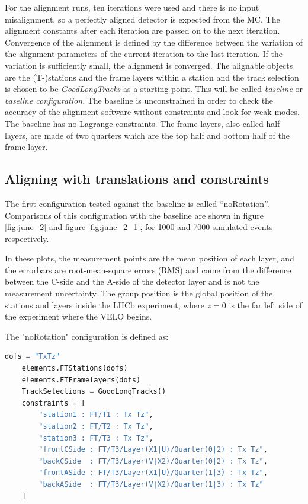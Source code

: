 For the alignment runs, ten iterations were used and there is no input misalignment, so a perfectly aligned detector is expected from the MC.
The alignment constants after each iteration are passed on to the next iteration.
Convergence of the alignment is defined by the difference between the variation of the alignment parameters of the current iteration to the last iteration. If the variation is sufficiently small, the alignment is converged.
The alignable objects are the (T-)stations and the frame layers within a station and the track selection is chosen to be \textit{GoodLongTracks} as a starting point. This will be called \textit{baseline} or \textit{baseline configuration}.
The baseline is unconstrained in order to check the accuracy of the alignment software without constraints and look for weak modes.
The baseline has no Lagrange constraints.
The frame layers, also called half layers, are made of two quarters which are the top half and bottom half of the frame layer.

\subsection{Aligning with translations and constraints}
The first configuration tested against the baseline is called “noRotation”. Comparisons of this configuration with the baseline are shown in figure \ref{fig:june_2} and figure \ref{fig:june_2_1}, for 1000 and 7000 simulated events respectively.

In these plots, the measurement points are the mean position of each layer, and the errorbars are root-mean-square errors (RMS) and come from the difference between the C-side and the A-side of the detector layer and is not the measurement uncertainty.
The group position is the global position of the stations and layers inside the LHCb experiment, where $z = 0$ is the far left side of the experiment where the VELO begins.

The "noRotation" configuration is defined as:

\begin{lstlisting}[language=Python]
    dofs = "TxTz"
    elements.FTStations(dofs)
    elements.FTFramelayers(dofs)
    TrackSelections = GoodLongTracks()
    constraints = [
        "station1 : FT/T1 : Tx Tz",
        "station2 : FT/T2 : Tx Tz",
        "station3 : FT/T3 : Tx Tz",
        "frontCSide : FT/T3/Layer(X1|U)/Quarter(0|2) : Tx Tz",
        "backCSide  : FT/T3/Layer(V|X2)/Quarter(0|2) : Tx Tz",
        "frontASide : FT/T3/Layer(X1|U)/Quarter(1|3) : Tx Tz",
        "backASide  : FT/T3/Layer(V|X2)/Quarter(1|3) : Tx Tz"
    ]
\end{lstlisting}

